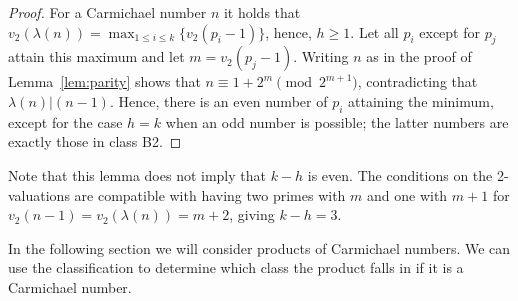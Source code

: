 \documentclass[runningheads]{amsart}
\begin{document}
\begin{proof}
For a Carmichael number $n$ it holds that
$v_2(\lambda(n))
=
\max_{1\le
i
\le
k}\{v_2(p_i
-1)\}$,
hence,
$h
\ge
1$.
Let all
$p_i$
except for
$p_j$
attain this maximum and let $m =
v_2(p_j
- 1)$.
Writing $n$ as in the proof of
Lemma~\ref{lem:parity}
shows that $n
\equiv
1 +
2^m
\pmod{2^{m+1}}$,
contradicting that
$\lambda(n)|(n-1)$.
Hence,
there is an even number of
$p_i$
attaining the minimum,
except for the case $h=k$ when an odd number is possible;
the latter numbers are exactly those in class B2.
\end{proof}

Note that this lemma does not imply that $k-h$ is even.
The conditions on the 2-valuations are compatible with having two primes with $m$
and one with $m+1$ for
$v_2(n-1)
=
v_2(\lambda(n))
= m+2$,
giving $k-h = 3$.

In the following section we will consider products of Carmichael numbers.
We can use the classification to determine which class the product falls in if it
is a Carmichael number.
\end{document}
